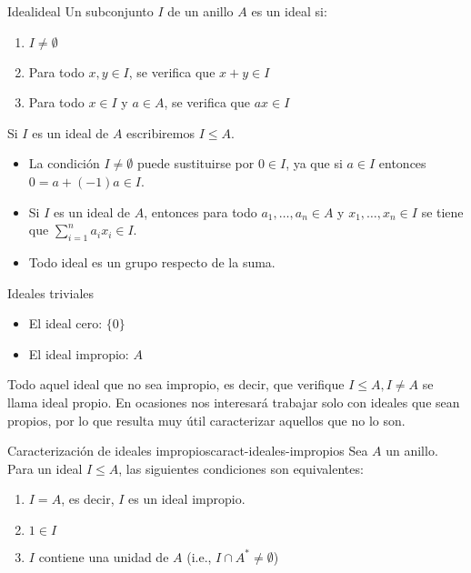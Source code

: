 \begin{definition}{Ideal}{ideal}
    Un subconjunto \(I\) de un anillo \(A\) es un {ideal} si:
    \begin{enumerate}
        \item \(I \neq \emptyset\)
        \item Para todo \(x, y \in I\), se verifica que \(x + y \in I\)
        \item Para todo \(x \in I\) y \(a \in A\), se verifica que \(ax \in I\)
    \end{enumerate}
\end{definition}

Si $I$ es un ideal de $A$ escribiremos $I \leq A$.

\begin{remark}
    \begin{itemize}
        \item La condición \(I \neq \emptyset\) puede sustituirse por \(0 \in I\), ya que si \(a \in I\) entonces \(0 = a + (-1)a \in I\).
        \item Si \(I\) es un ideal de \(A\), entonces para todo \(a_1, \ldots, a_n \in A\) y \(x_1, \ldots, x_n \in I\) se tiene que \(\sum_{i=1}^n a_i x_i \in I\).
        \item Todo ideal es un grupo respecto de la suma.
    \end{itemize}
\end{remark}

\begin{example}{Ideales triviales}{}
    \begin{itemize}
        \item El {ideal cero}: \(\{0\}\)
        \item El {ideal impropio}: \(A\)
    \end{itemize}
\end{example}

Todo aquel ideal que no sea impropio, es decir, que verifique $I \leq A, I \neq A$ se llama ideal propio. En ocasiones nos interesará trabajar solo con ideales que sean propios, por lo que resulta muy útil caracterizar aquellos que no lo son.

\begin{lemma}{Caracterización de ideales impropios}{caract-ideales-impropios}
    Sea \(A\) un anillo. Para un ideal \(I \leq A\), las siguientes condiciones son equivalentes:
    \begin{enumerate}
        \item \(I = A\), es decir, $I$ es un ideal impropio.
        \item \(1 \in I\)
        \item \(I\) contiene una unidad de \(A\) (i.e., \(I \cap A^* \neq \emptyset\))
    \end{enumerate}
\end{lemma}

